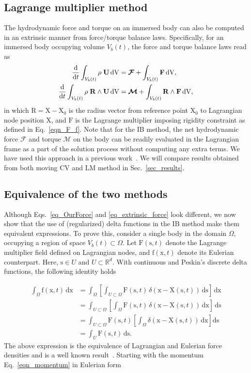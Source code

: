 \documentclass[review]{elsarticle}
\renewcommand \d [2]{\frac{{\rm d} #1}{{\rm d} #2}}
\renewcommand{\vec}[1]{\bm{\mathrm{#1}}}
\def \x{\vec{x}}
\def \F{\vec{F}}
\def \U{\vec{U}}
\def \cM{\vec{\mathcal{M}}}
\def \Vbt{V_b(t)}
\def \cF{\vec{\mathcal{F}}}
\def \F{\vec{F}}
\def \R{\vec{R}}
\def \U{\vec{U}}
\def \X{\vec{X}}
\def \f{\vec{f}}
\def \s{\vec{s}}
\def \x{\vec{x}}
\def \Ds{{\mathrm d}\s}
\def \dV{\,\mathrm{dV}}
\def \Dx{{\mathrm d}\x}
\def \Rcross{\R \wedge}
\begin{document}
\subsection{Lagrange multiplier method}
The hydrodynamic force and torque on an immersed body can also be computed
in an extrinsic manner from force/torque balance laws. Specifically, for an immersed
body occupying volume $\Vbt$, the force and torque balance laws read as
\begin{align}
 \d{}{t} \int_{\Vbt} \rho \; \U \dV &= \cF + \int_{\Vbt} \F \dV, \label{eq_extrinsic_force} \\
  \d{}{t} \int_{\Vbt} \rho \; \Rcross \U \dV &= \cM + \int_{\Vbt} \Rcross \F \dV, \label{eq_extrinsic_torque}
 \end{align}
in which $\R = \X - \X_0$ is the radius vector from reference point $\X_0$ to Lagrangian node
position $\X$, and $\F$ is the Lagrange multiplier imposing rigidity constraint as defined in 
Eq.~\eqref{eqn_F_f}. Note that for the IB method, the net hydrodynamic force $\cF$ and torque 
$\cM$ on the body can be readily evaluated in the Lagrangian frame as a part of the solution 
process without computing any extra terms. We have used this approach in a previous 
work~\cite{Bhalla13}. We will compare results obtained from both moving CV and LM method 
in Sec.~\ref{sec_results}.

\subsection{Equivalence of the two methods}

Although Eqs.~\eqref{eq_OurForce} and \eqref{eq_extrinsic_force} look different, 
we now show that the use of (regularized) delta functions in the IB method 
make them equivalent expressions. To prove this, consider a single body in the domain 
$\Omega$, occupying a region of space $\Vbt \subset \Omega$.  Let $\F(\s,t)$
denote the Lagrange multiplier field defined on Lagrangian nodes, and $\f(\x,t)$
denote its Eulerian counterpart. Here, $\s \in U$ and $ U \subset \mathbb{R}^d$.
With continuous and Peskin's discrete delta functions, the following 
identity holds 

\begin{align}
\int_{\Omega} \f(\x,t)  \, \Dx &= \int_{\Omega} \left[\int_{U \subset \Omega} \F(\s,t) \, \delta(\x - \X(\s,t)) \, \Ds \right]    \, \Dx   \nonumber\\
					  &= \int_{U \subset \Omega} \left[\int_{\Omega} \F(\s,t) \, \delta(\x - \X(\s,t)) \, \Dx \right]    \, \Ds   \nonumber\\
                                            &= \int_{U \subset \Omega}  \F(\s,t) \left[ \int_{\Omega} \delta(\x - \X(\s,t)) \, \Dx \right] \Ds  \nonumber \\
                                            &= \int_{U} \F(\s,t) \, \Ds \label{eq_lag_eul_equivalence}.
\end{align}  
The above expression is the equivalence of Lagrangian and Eulerian force
densities and is a well known result~\cite{Peskin02, Griffith07}.  Starting with the momentum 
Eq.~\eqref{eqn_momentum} in Eulerian form
\end{document}
